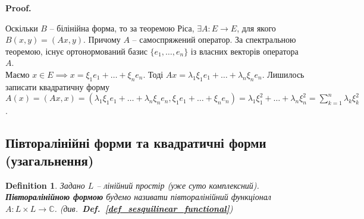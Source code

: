 \documentclass[a4paper, 10pt]{article}
\makeatletter
\theoremstyle{theoremdd}
\newtheorem{definition}[theorem]{Definition}
\newcommand\defref[1]{\textbf{Def.~\ref{#1}}}
\renewenvironment{proof}[1][Proof.\\]{\par
\pushQED{\hfill \qed}%
\normalfont \topsep6\p@\@plus6\p@\relax
\trivlist
\item\relax
{\bfseries
#1\@addpunct{.}}\hspace\labelsep\ignorespaces
}{%
\popQED\endtrivlist\@endpefalse
}
\makeatother
\begin{document}
\begin{proof}
Оскільки $B$ -- білінійна форма, то за теоремою Ріса, $\exists A: E \to E$, для якого $B(x,y) = (Ax,y)$. Причому $A$ -- самоспряжений оператор. За спектральною теоремою, існує ортонормований базис $\{e_1,\dots,e_n\}$ із власних векторів оператора $A$.\\
Маємо $x \in E \implies x = \xi_1 e_1 + \dots + \xi_n e_n$. Тоді $Ax = \lambda_1 \xi_1 e_1 + \dots + \lambda_n \xi_n e_n$. Лишилось записати квадратичну форму\\
$A(x) = (Ax,x) = (\lambda_1 \xi_1 e_1 + \dots + \lambda_n \xi_n e_n, \xi_1 e_1 + \dots + \xi_n e_n) = \lambda_1 \xi_1^2 + \dots + \lambda_n \xi_n^2 = \displaystyle\sum_{k=1}^n \lambda_k \xi_k^2$.
\end{proof}

\subsection{Півторалінійні форми та квадратичні форми (узагальнення)}
\begin{definition}
Задано $L$ -- лінійний простір (уже суто комплексний).\\
\textbf{Півторалінійною формою} будемо називати півторалінійний функціонал $A \colon L \times L \to \mathbb{C}$. (див.\ \defref{def_sesquilinear_functional})
\end{definition}
\end{document}
